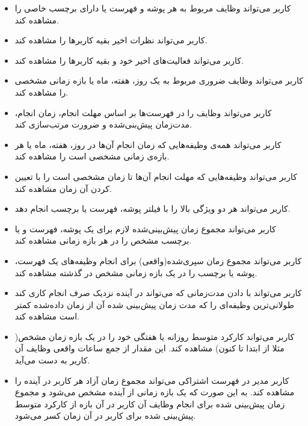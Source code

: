 \documentclass{article}
\begin{document}
\begin{itemize}

\item کاربر می‌تواند وظایف مربوط به هر پوشه و فهرست یا دارای برچسب خاصی را مشاهده کند.

\item کاربر می‌تواند نظرات اخیر بقیه کاربر‌ها را مشاهده کند.

\item کاربر می‌تواند فعالیت‌های اخیر خود و بقیه کاربر‌ها را مشاهده کند.

\item کاربر می‌تواند وظایف ضروری مربوط به یک روز، هفته، ماه یا بازه زمانی مشخصی را مشاهده کند.

\item کاربر می‌تواند وظایف را در فهرست‌ها بر اساس مهلت انجام، زمان انجام، مدت‌زمان پیش‌بنی‌شده و ضرورت مرتب‌سازی کند.

\item کاربر می‌تواند همه‌ی وظیفه‌هایی که زمان انجام آن‌ها در روز، هفته، ماه یا هر بازه‌ی زمانی مشخصی است را مشاهده کند.

\item کاربر می‌تواند وظیفه‌هایی که مهلت انجام آن‌ها تا زمان مشخصی‌ است را با تعیین کردن آن زمان مشاهده‌ کند.

\item کاربر می‌تواند هر دو ویژگی بالا را با فیلتر پوشه‌، فهرست یا برچسب انجام دهد.

\item کاربر می‌تواند مجموع زمان پیش‌بینی‌شده لازم برای یک پوشه، فهرست و یا برچسب مشخص را در هر بازه زمانی مشاهده کند.

\item کاربر می‌تواند مجموع زمان سپری‌شده(واقعی) برای انجام وظیفه‌های یک فهرست، پوشه یا برچسب را در یک بازه زمانی مشخص‌ در گذشته مشاهده کند.

\item کاربر می‌تواند با دادن مدت‌زمانی که می‌تواند در آینده نزدیک صرف انجام کاری کند طولانی‌ترین وظیفه‌ای را که مدت زمان پیش‌بینی شده آن از زمان داده‌شده کمتر است مشاهده کند.

\item کاربر می‌تواند کارکرد متوسط روزانه یا هفتگی خود را در یک بازه زمان مشخص( مثلا از ابتدا تا کنون) مشاهده کند. این مقدار از جمع ساعات واقعی وظایف آن کاربر به دست می‌آید.

\item کاربر مدیر در فهرست اشتراکی می‌تواند مجموع زمان آزاد هر کاربر در آینده را مشاهده کند. به این صورت که یک بازه زمانی از آینده مشخص می‌شود و مجموع زمان پیش‌بینی شده برای انجام وظایف آن کاربر در آن بازه از کارکرد متوسط پیش‌بینی شده برای کاربر در آن زمان کسر می‌شود.


\end{itemize}
\end{document}
